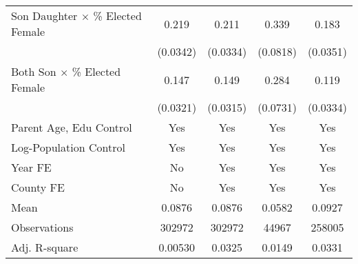 \begin{table}[htbp]
{\begin{tabular}{l*{4}{c}}
            Son Daughter $\times$ \% Elected Female  & 0.219\sym{***}                       & 0.211\sym{***}                       & 0.339\sym{***}                       & 0.183\sym{***}                       \\
                                                     & (0.0342)                             & (0.0334)                             & (0.0818)                             & (0.0351)                             \\
            Both Son $\times$ \% Elected Female      & 0.147\sym{***}                       & 0.149\sym{***}                       & 0.284\sym{***}                       & 0.119\sym{***}                       \\
                                                     & (0.0321)                             & (0.0315)                             & (0.0731)                             & (0.0334)                             \\
            Parent Age, Edu Control                  & Yes                                  & Yes                                  & Yes                                  & Yes                                  \\
            Log-Population Control                   & Yes                                  & Yes                                  & Yes                                  & Yes                                  \\
            Year FE                                  & No                                   & Yes                                  & Yes                                  & Yes                                  \\
            County FE                                & No                                   & Yes                                  & Yes                                  & Yes                                  \\
            \midrule
            Mean                                     & 0.0876                               & 0.0876                               & 0.0582                               & 0.0927                               \\
            Observations                             & 302972                               & 302972                               & 44967                                & 258005                               \\
            Adj. R-square                            & 0.00530                              & 0.0325                               & 0.0149                               & 0.0331                               \\

\end{tabular}}
\end{table}

